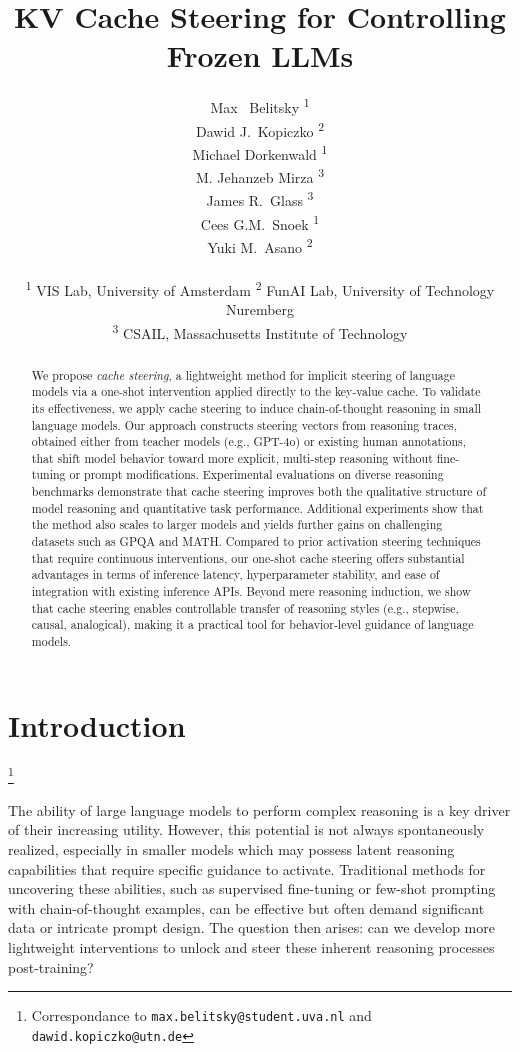 \documentclass{article} %
\title{KV Cache Steering for Controlling Frozen LLMs}
\author{
  Max ~Belitsky \textsuperscript{1} \\
  \And
  Dawid J.~Kopiczko \textsuperscript{2} \\
  \And
  Michael Dorkenwald \textsuperscript{1} \\
  \And
  M. Jehanzeb Mirza \textsuperscript{3} \\
  \And
  James R.~Glass \textsuperscript{3} \\
  \And
  Cees G.M.~Snoek \textsuperscript{1} \\
  \And
  Yuki M.~Asano \textsuperscript{2}
\\
\AND
\\
 \textsuperscript{1} VIS Lab, University of Amsterdam
 \hspace{0.5em}
 \textsuperscript{2} FunAI Lab, University of Technology Nuremberg \\
 \textsuperscript{3} CSAIL, Massachusetts Institute of Technology
}
\begin{document}
\maketitle

\begin{abstract}
We propose \textit{cache steering}, a lightweight method for implicit steering of language models via a one-shot intervention applied directly to the key-value cache. To validate its effectiveness, we apply cache steering to induce chain-of-thought reasoning in small language models. Our approach constructs steering vectors from reasoning traces, obtained either from teacher models (e.g., GPT-4o) or existing human annotations, that shift model behavior toward more explicit, multi-step reasoning without fine-tuning or prompt modifications. Experimental evaluations on diverse reasoning benchmarks demonstrate that cache steering improves both the qualitative structure of model reasoning and quantitative task performance. Additional experiments show that the method also scales to larger models and yields further gains on challenging datasets such as GPQA and MATH. Compared to prior activation steering techniques that require continuous interventions, our one-shot cache steering offers substantial advantages in terms of inference latency, hyperparameter stability, and ease of integration with existing inference APIs. Beyond mere reasoning induction, we show that cache steering enables controllable transfer of reasoning styles (e.g., stepwise, causal, analogical), making it a practical tool for behavior-level guidance of language models.
\end{abstract}


\section{Introduction}

\let\thefootnote\relax\footnote{Correspondance to \texttt{max.belitsky@student.uva.nl} and \texttt{dawid.kopiczko@utn.de}}

The ability of large language models to perform complex reasoning is a key driver of their increasing utility. However, this potential is not always spontaneously realized, especially in smaller models which may possess latent reasoning capabilities that require specific guidance to activate. Traditional methods for uncovering these abilities, such as supervised fine-tuning or few-shot prompting with chain-of-thought examples, can be effective but often demand significant data or intricate prompt design. The question then arises: can we develop more lightweight interventions to unlock and steer these inherent reasoning processes post-training?
\end{document}
